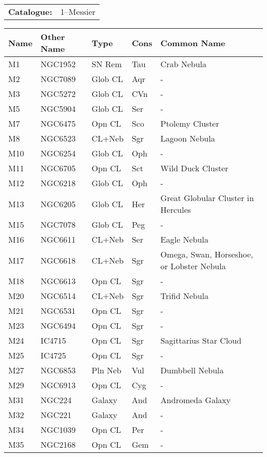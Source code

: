 \begin{tabular}{ p{0.9in} p{1.3in}}
{\bf Catalogue:} & 1--Messier \\ 
\end{tabular}
\centering 
\begin{longtable}{ p{0.7in}  p{1.0in}  p{0.6in}  p{0.9in}  p{4.0in} }
\hline 
{\bf Name} & {\bf Other Name} & {\bf Type} & {\bf Cons} & {\bf Common Name} \\ 
\hline 
M1 & NGC1952 & SN Rem & Tau & Crab Nebula \\ 
M2 & NGC7089 & Glob CL & Aqr & - \\ 
M3 & NGC5272 & Glob CL & CVn & - \\ 
M5 & NGC5904 & Glob CL & Ser & - \\ 
M7 & NGC6475 & Opn CL & Sco & Ptolemy Cluster \\ 
M8 & NGC6523 & CL+Neb & Sgr & Lagoon Nebula \\ 
M10 & NGC6254 & Glob CL & Oph & - \\ 
M11 & NGC6705 & Opn CL & Sct & Wild Duck Cluster \\ 
M12 & NGC6218 & Glob CL & Oph & - \\ 
M13 & NGC6205 & Glob CL & Her & Great Globular Cluster in Hercules \\ 
M15 & NGC7078 & Glob CL & Peg & - \\ 
M16 & NGC6611 & CL+Neb & Ser & Eagle Nebula \\ 
M17 & NGC6618 & CL+Neb & Sgr & Omega, Swan, Horseshoe, or Lobster Nebula \\ 
M18 & NGC6613 & Opn CL & Sgr & - \\ 
M20 & NGC6514 & CL+Neb & Sgr & Trifid Nebula \\ 
M21 & NGC6531 & Opn CL & Sgr & - \\ 
M23 & NGC6494 & Opn CL & Sgr & - \\ 
M24 & IC4715 & Opn CL & Sgr & Sagittarius Star Cloud \\ 
M25 & IC4725 & Opn CL & Sgr & - \\ 
M27 & NGC6853 & Pln Neb & Vul & Dumbbell Nebula \\ 
M29 & NGC6913 & Opn CL & Cyg & - \\ 
M31 & NGC224 & Galaxy & And & Andromeda Galaxy \\ 
M32 & NGC221 & Galaxy & And & - \\ 
M34 & NGC1039 & Opn CL & Per & - \\ 
M35 & NGC2168 & Opn CL & Gem & - \\ 

\end{longtable}
